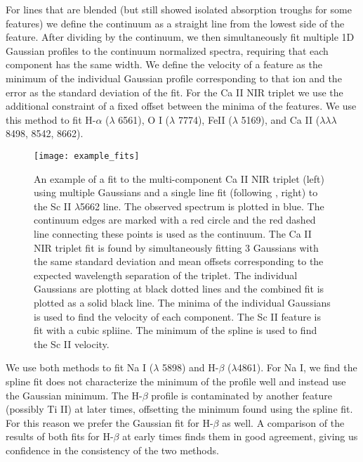 \documentclass[preprint]{aastex61}
\begin{document}
For lines that are blended (but still showed isolated absorption troughs for some features) we define the continuum as a straight line from the lowest side of the feature. 
After dividing by the continuum, we then simultaneously fit multiple 1D Gaussian profiles to the continuum normalized spectra, requiring that each component has the same width.
We define the velocity of a feature as the minimum of the individual Gaussian profile corresponding to that ion and the error as the standard deviation of the fit. 
For the Ca II NIR triplet we use the additional constraint of a fixed offset between the minima of the features. 
We use this method to fit H-$\alpha$ ($\lambda$ 6561), O I ($\lambda$ 7774), FeII ($\lambda$ 5169), and Ca II ($\lambda\lambda\lambda$ 8498, 8542, 8662). 

\begin{figure}[htbp]
\begin{center}
\texttt{[image: example\_fits]}
\caption{An example of a fit to the multi-component Ca II NIR triplet (left) using multiple Gaussians and a single line fit (following \citet{2012silverman}, right) to the Sc II $\lambda$5662 line.
The observed spectrum is plotted in blue.
The continuum edges are marked with a red circle and the red dashed line connecting these points is used as the continuum. 
The Ca II NIR triplet fit is found by simultaneously fitting 3 Gaussians with the same standard deviation and mean offsets corresponding to the expected wavelength separation of the triplet. 
The individual Gaussians are plotting at black dotted lines and the combined fit is plotted as a solid black line. 
The minima of the individual Gaussians is used to find the velocity of each component.
The Sc II feature is fit with a cubic spliine. 
The minimum of the spline is used to find the Sc II velocity.
}
\label{fig:VelocityFit}
\end{center}
\end{figure}

We use both methods to fit Na I ($\lambda$ 5898) and H-$\beta$ ($\lambda$4861). 
For Na I, we find the spline fit does not characterize the minimum of the profile well and instead use the Gaussian minimum. 
The H-$\beta$ profile is contaminated by another feature (possibly Ti II) at later times, offsetting the minimum found using the spline fit. 
For this reason we prefer the Gaussian fit for H-$\beta$ as well. 
A comparison of the results of both fits for H-$\beta$ at early times finds them in good agreement, giving us confidence in the consistency of the two methods.
\end{document}
